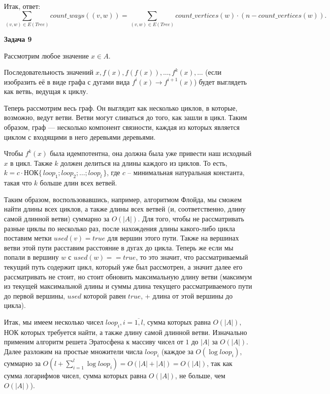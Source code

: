 \documentclass[12pt]{article}
\begin{document}
	Итак, ответ:
	$$ \sum\limits_{(v, w) \in E(Tree)} count\_ways((v, w)) = \sum\limits_{(v, w) \in E(Tree)} count\_vertices(w) \cdot (n - count\_vertices(w)). $$
	\newline
	
	\textbf{\large Задача 9}
	
	Рассмотрим любое значение $ x \in A $.
	
	Последовательность значений	
	$ x, f(x), f(f(x)), \ldots , f^k(x), \ldots $ (если изобразить её в виде графа с дугами вида $ f^i(x) \rightarrow f^{i + 1}(x) $) будет выглядеть как ветвь, ведущая к циклу.
	
	Теперь рассмотрим весь граф. Он выглядит как несколько циклов, в которые, возможно, ведут ветви. Ветви могут сливаться до того, как зашли в цикл. Таким образом, граф --- несколько компонент связности, каждая из которых является циклом с входящими в него деревьями деревьями.
	
	Чтобы $ f^k(x) $ была идемпотентна, она должна была уже привести наш исходный $ x $ в цикл. Также $ k $ должен делиться на длины каждого из циклов. То есть, $ k = c \cdot \mbox{НОК} \{\, loop_1; loop_2; \ldots ; loop_l \,\} $, где $ c $ -- минимальная натуральная константа, такая что $ k $ больше длин всех ветвей.
	\newline
	
	Таким образом, воспользовавшись, например, алгоритмом Флойда, мы сможем найти длины всех циклов, а также длины всех ветвей (и, соответственно, длину самой длинной ветви) суммарно за $ O(|A|) $. Для того, чтобы не рассматривать разные циклы по несколько раз, после нахождения длины какого-либо цикла поставим метки $ used(v) = true $ для вершин этого пути. Также на вершинах ветви этой пути расставим расстояние в дугах до цикла. Теперь же если мы попали в вершину $ w $ с $ used(w) == true $, то это значит, что рассматриваемый текущий путь содержит цикл, который уже был рассмотрен, а значит далее его рассматривать не стоит, но стоит обновить максимальную длину ветви (максимум из текущей максимальной длины и суммы длина текущего рассматриваемого пути до первой вершины, $ used $ которой равен $ true $, + длина от этой вершины до цикла).
	
	Итак, мы имеем несколько чисел $ loop_i, i = \overline{1, l} $, сумма которых равна $ O(|A|) $, НОК которых требуется найти, а также длину самой длинной ветви. Изначально применим алгоритм решета Эратосфена к массиву чисел от $ 1 $ до $ |A| $ за $ O(|A|) $. Далее разложим на простые множители числа $ loop_i $ (каждое за $ O(\log{loop_i}) $, суммарно за $ O(l + \sum\limits_{i = 1}^l \log{loop_i}) = O(|A| + |A|) = O(|A|)$, так как сумма логарифмов чисел, сумма которых равна $ O(|A|) $, не больше, чем $ O(|A|) $).
	
\end{document}
